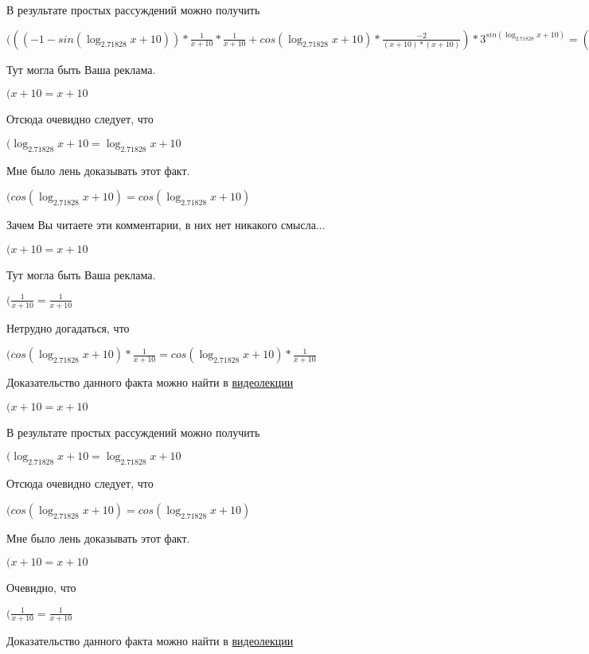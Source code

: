 \documentclass[12pt,a4paper,fleqn]{article}
\theoremstyle{definition}
\begin{document}
В результате простых рассуждений можно получить

$((( -1  - sin(\log_{ 2.71828 }{ x  +  10 })) * \frac{ 1 }{ x  +  10 }
 * \frac{ 1 }{ x  +  10 }
 + cos(\log_{ 2.71828 }{ x  +  10 }) * \frac{ -2 }{( x  +  10 ) * ( x  +  10 )}
) * { 3 }^{sin(\log_{ 2.71828 }{ x  +  10 })} = (( -1  - sin(\log_{ 2.71828 }{ x  +  10 })) * \frac{ 1 }{ x  +  10 }
 * \frac{ 1 }{ x  +  10 }
 + cos(\log_{ 2.71828 }{ x  +  10 }) * \frac{ -2 }{( x  +  10 ) * ( x  +  10 )}
) * { 3 }^{sin(\log_{ 2.71828 }{ x  +  10 })}$

Тут могла быть Ваша реклама.

$( x  +  10  =  x  +  10 $

Отсюда очевидно следует, что

$(\log_{ 2.71828 }{ x  +  10 } = \log_{ 2.71828 }{ x  +  10 }$

Мне было лень доказывать этот факт.

$(cos(\log_{ 2.71828 }{ x  +  10 }) = cos(\log_{ 2.71828 }{ x  +  10 })$

Зачем Вы читаете эти комментарии, в них нет никакого смысла...

$( x  +  10  =  x  +  10 $

Тут могла быть Ваша реклама.

$(\frac{ 1 }{ x  +  10 }
 = \frac{ 1 }{ x  +  10 }
$

Нетрудно догадаться, что

$(cos(\log_{ 2.71828 }{ x  +  10 }) * \frac{ 1 }{ x  +  10 }
 = cos(\log_{ 2.71828 }{ x  +  10 }) * \frac{ 1 }{ x  +  10 }
$

Доказательство данного факта можно найти в \href{https://www.youtube.com/watch?v=dQw4w9WgXcQ}{видеолекции}

$( x  +  10  =  x  +  10 $

В результате простых рассуждений можно получить

$(\log_{ 2.71828 }{ x  +  10 } = \log_{ 2.71828 }{ x  +  10 }$

Отсюда очевидно следует, что

$(cos(\log_{ 2.71828 }{ x  +  10 }) = cos(\log_{ 2.71828 }{ x  +  10 })$

Мне было лень доказывать этот факт.

$( x  +  10  =  x  +  10 $

Очевидно, что

$(\frac{ 1 }{ x  +  10 }
 = \frac{ 1 }{ x  +  10 }
$

Доказательство данного факта можно найти в \href{https://www.youtube.com/watch?v=dQw4w9WgXcQ}{видеолекции}
\end{document}
